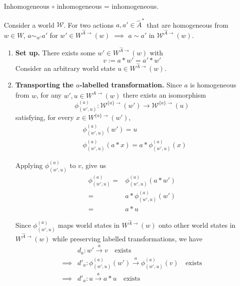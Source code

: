 \begin{propositionE}[][normal]
    Inhomogeneous $\circ$ inhomogeneous = inhomogeneous.
\end{propositionE}
\begin{proofE}
\end{proofE}


\begin{propositionE}
    Consider a world $\mathscr{W}$.
    For two actions $a, a' \in \hat{A}^{*}$ that are homogeneous from $w \in W$, $a \sim_{w'} a'$ for $w' \in W^{\hat{A}\to}(w)$ $\implies$ $a \sim a'$ in $\mathscr{W}^{\hat{A}\to}(w)$.
\end{propositionE}
\begin{proofE}
\begin{enumerate}[(1)]
    \item \textbf{Set up.}
    There exists some $w' \in W^{\hat{A}\to}(w)$ with
    \begin{equation}
        v := a \ast w' = a' \ast w'
    \end{equation}
    Consider an arbitrary world state $u \in W^{\hat{A}\to}(w)$.

    \item \textbf{Transporting the $a$-labelled transformation.}
    Since $a$ is homogeneous from $w$, for any $w', u \in W^{\hat{A}\to}(w)$ there exists an isomorphism
    \begin{equation}
        \phi_{(w', u)}^{(a)}: \mathscr{W}^{\{a\}\to}(w') \to \mathscr{W}^{\{a\}\to}(u)
    \end{equation}
    satisfying, for every $x \in W^{\{a\}\to}(w')$,
    \begin{align}
        & \phi_{(w', u)}^{(a)}(w') = u \\
        & \phi_{(w', u)}^{(a)}(a \ast x) = a \ast \phi_{(w', u)}^{(a)}(x)
    \end{align}

    Applying $\phi^{(a)}_{(w', u)}$ to $v$, give us
    \begin{align}
        \phi^{(a)}_{(w', u)} = & \phi^{(a)}_{(w', u)}(a \ast w') \\
        = & a \ast \phi^{(a)}_{(w', u)}(w') \\
        = & a \ast u
    \end{align}

    Since $\phi^{(a)}_{(w', u)}$ maps world states in $W^{\hat{A}\to}(w)$ onto other world states in $W^{\hat{A}\to}(w)$ while preserving labelled transformations, we have
    \begin{align}
        & d_{a}: w' \xrightarrow{a} v \quad \text{exists} \\
        \implies & d'_{a}: \phi^{(a)}_{(w', u)}(w') \xrightarrow{a} \phi^{(a)}_{(w', u)}(v) \quad \text{exists} \\
        \implies & d'_{a}: u \xrightarrow{a} a \ast u \quad \text{exists}
    \end{align}


\end{enumerate}
\end{proofE}

